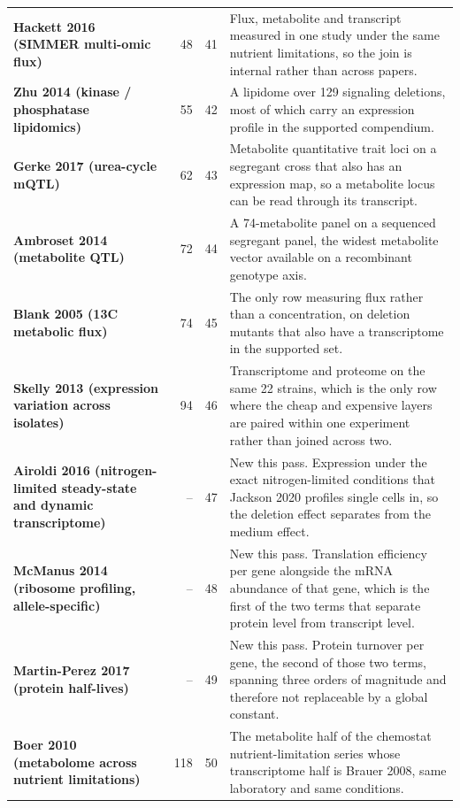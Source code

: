 \begin{longtable}{@{}L{46mm} r@{\hspace{6pt}} r@{\hspace{6pt}} L{104mm}@{}}
\addlinespace[5pt]
\textbf{Hackett 2016 (SIMMER multi-omic flux)} & 48 & 41 & Flux, metabolite and transcript measured in one study under the same nutrient limitations, so the join is internal rather than across papers. \\
\addlinespace[5pt]
\textbf{Zhu 2014 (kinase / phosphatase lipidomics)} & 55 & 42 & A lipidome over 129 signaling deletions, most of which carry an expression profile in the supported compendium. \\
\addlinespace[5pt]
\textbf{Gerke 2017 (urea-cycle mQTL)} & 62 & 43 & Metabolite quantitative trait loci on a segregant cross that also has an expression map, so a metabolite locus can be read through its transcript. \\
\addlinespace[5pt]
\textbf{Ambroset 2014 (metabolite QTL)} & 72 & 44 & A 74-metabolite panel on a sequenced segregant panel, the widest metabolite vector available on a recombinant genotype axis. \\
\addlinespace[5pt]
\textbf{Blank 2005 (13C metabolic flux)} & 74 & 45 & The only row measuring flux rather than a concentration, on deletion mutants that also have a transcriptome in the supported set. \\
\addlinespace[5pt]
\textbf{Skelly 2013 (expression variation across isolates)} & 94 & 46 & Transcriptome and proteome on the same 22 strains, which is the only row where the cheap and expensive layers are paired within one experiment rather than joined across two. \\
\addlinespace[5pt]
\textbf{Airoldi 2016 (nitrogen-limited steady-state and dynamic transcriptome)} & -- & 47 & New this pass. Expression under the exact nitrogen-limited conditions that Jackson 2020 profiles single cells in, so the deletion effect separates from the medium effect. \\
\addlinespace[5pt]
\textbf{McManus 2014 (ribosome profiling, allele-specific)} & -- & 48 & New this pass. Translation efficiency per gene alongside the mRNA abundance of that gene, which is the first of the two terms that separate protein level from transcript level. \\
\addlinespace[5pt]
\textbf{Martin-Perez 2017 (protein half-lives)} & -- & 49 & New this pass. Protein turnover per gene, the second of those two terms, spanning three orders of magnitude and therefore not replaceable by a global constant. \\
\addlinespace[5pt]
\textbf{Boer 2010 (metabolome across nutrient limitations)} & 118 & 50 & The metabolite half of the chemostat nutrient-limitation series whose transcriptome half is Brauer 2008, same laboratory and same conditions. \\

\end{longtable}
